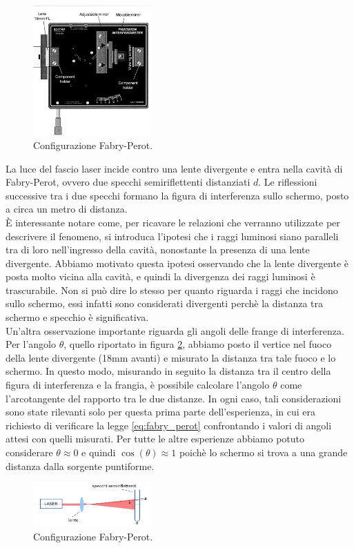 \documentclass[letterpaper,12pt]{article}
\begin{document}
\begin{figure}[ht]
    \centering
    \includegraphics[width=0.4\textwidth]{InterferometroFabry.png}
    \caption{Configurazione Fabry-Perot.}
    \label{fig:fabry-perot config}
\end{figure}

La luce del fascio laser incide contro una lente divergente e entra nella cavità di Fabry-Perot, ovvero due specchi semiriflettenti 
distanziati $d$. Le riflessioni successive tra i due specchi formano la figura di interferenza sullo schermo, posto
a circa un metro di distanza. \\ 
È interessante notare come, per ricavare le relazioni che verranno utilizzate per descrivere il fenomeno, si 
introduca l'ipotesi che i raggi luminosi siano paralleli tra di loro nell'ingresso della cavità, nonostante la 
presenza di una lente divergente. Abbiamo motivato questa ipotesi osservando che la lente divergente è posta
molto vicina alla cavità, e quindi la divergenza dei raggi luminosi è trascurabile. Non si può dire lo stesso per 
quanto riguarda i raggi che incidono sullo schermo, essi infatti sono considerati divergenti perchè la distanza tra
schermo e specchio è significativa.\\
Un'altra osservazione importante riguarda gli angoli delle frange di interferenza. 
Per l'angolo $\theta$, quello riportato in figura \ref{fig:fabry_perot_scheda}, 
abbiamo posto il vertice nel fuoco della lente divergente (18mm avanti) e misurato la distanza tra tale fuoco e lo schermo. 
In questo modo, misurando in seguito la distanza tra il centro della figura di interferenza e la frangia, 
è possibile calcolare l'angolo $\theta$ come l'arcotangente del rapporto tra le due distanze. In ogni caso, tali 
considerazioni sono state rilevanti solo per questa prima parte dell'esperienza, in cui era richiesto di verificare 
la legge \eqref{eq:fabry_perot} confrontando i valori di angoli attesi con quelli misurati. Per tutte le altre esperienze 
abbiamo potuto considerare $\theta \approx 0$ e quindi $\cos(\theta) \approx 1$ poichè lo schermo si trova 
a una grande distanza dalla sorgente puntiforme.
\begin{figure}[h!]
    \centering
    \includegraphics[width=0.4\textwidth]{fabry_perot_config.JPG}
    \caption{Configurazione Fabry-Perot.}
    \label{fig:fabry_perot_scheda}
\end{figure}
\end{document}
